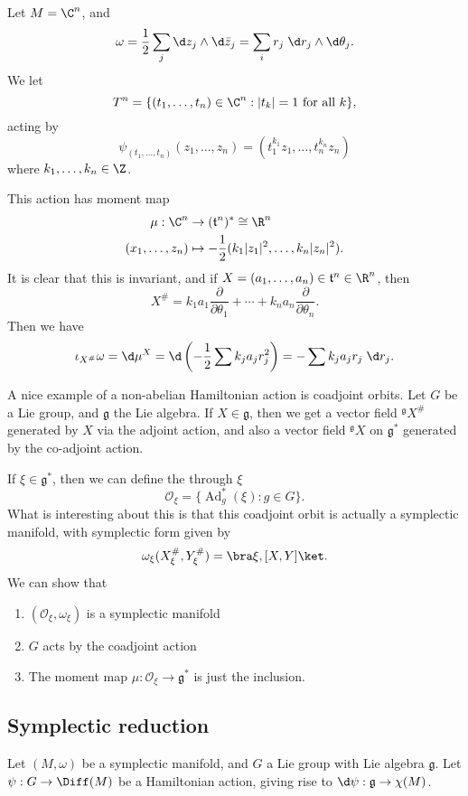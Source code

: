 \documentclass[a4paper]{article}
\DeclareMathOperator{\Ad}{Ad}
\begin{document}
\begin{eg}
  Let $M = \C^n$, and
  \[
    \omega = \frac{1}{2} \sum_j \d z_j \wedge \d \bar{z}_j = \sum_i r_j \;\d r_j \wedge \d \theta_j.
  \]
  We let
  \[
    T^n = \{(t_1, \ldots, t_n) \in \C^n : |t_k| = 1\text{ for all }k\},
  \]
  acting by
  \[
    \psi_{(t_1, \ldots, t_n)}(z_1, \ldots, z_n) = (t_1^{k_1}z_1, \ldots, t_n^{k_n} z_n)
  \]
  where $k_1, \ldots, k_n \in \Z$.

  This action has moment map
  \begin{align*}
    \mu: \C^n &\to (\mathfrak{t}^n)^* \cong \R^n\\
    (x_1,\ldots, z_n) &\mapsto - \frac{1}{2} (k_1 |z_1|^2, \ldots, k_n |z_n|^2).
  \end{align*}
  It is clear that this is invariant, and if $X = (a_1, \ldots, a_n) \in \mathfrak{t}^n \in \R^n$, then
  \[
    X^\# = k_1 a_1 \frac{\partial}{\partial \theta_1} + \cdots + k_n a_n \frac{\partial}{\partial \theta_n}.
  \]
  Then we have
  \[
    \iota_{X^\#} \omega = \d \mu^X = \d \left(-\frac{1}{2} \sum k_j a_j r_j^2\right) = - \sum k_j a_j r_j \;\d r_j.
  \]
\end{eg}

A nice example of a non-abelian Hamiltonian action is coadjoint orbits. Let $G$ be a Lie group, and $\mathfrak{g}$ the Lie algebra. If $X \in \mathfrak{g}$, then we get a vector field $^{\mathfrak{g}} X^\#$ generated by $X$ via the adjoint action, and also a vector field $^{\mathfrak{g}}X$ on $\mathfrak{g}^*$ generated by the co-adjoint action.

If $\xi \in \mathfrak{g}^*$, then we can define the  through $\xi$
\[
  \mathcal{O}_\xi = \{ \Ad_g^*(\xi) : g \in G\}.
\]
What is interesting about this is that this coadjoint orbit is actually a symplectic manifold, with symplectic form given by
\[
  \omega_\xi (X_\xi^{\#}, Y_{\xi}^{\#}) = \bra \xi, [X, Y]\ket.
\]
We can show that
\begin{enumerate}
  \item $(\mathcal{O}_\xi, \omega_\xi)$ is a symplectic manifold
  \item $G$ acts by the coadjoint action
  \item The moment map $\mu: \mathcal{O}_\xi \to \mathfrak{g}^*$ is just the inclusion.
\end{enumerate}

\subsection{Symplectic reduction}
Let $(M, \omega)$ be a symplectic manifold, and $G$ a Lie group with Lie algebra $\mathfrak{g}$. Let $\psi: G \to \Diff(M)$ be a Hamiltonian action, giving rise to $\d \psi: \mathfrak{g} \to \chi(M)$.
\end{document}
